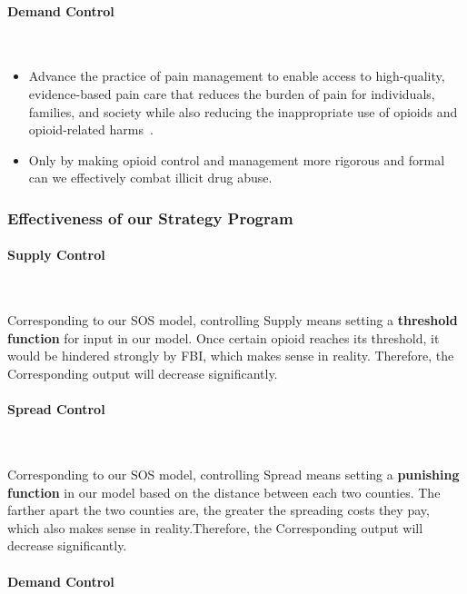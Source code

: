 \documentclass{mcmthesis}
\begin{document}
\paragraph{\textbf{Demand Control}}
~\smallskip

\begin{itemize}
    \item Advance the practice of pain management to enable access to high-quality, evidence-based pain care that reduces the burden of pain for individuals, families, and society while also reducing the inappropriate use of opioids and opioid-related harms~\cite{SEIGERMAN201928}.
    \item Only by making opioid control and management more rigorous and formal can we effectively combat illicit drug abuse.
\end{itemize}

\subsubsection{Effectiveness of our Strategy Program}
\paragraph{\textbf{Supply Control}}

~\smallskip

Corresponding to our SOS model, controlling Supply means setting a \textbf{threshold function} for input in our model. Once certain opioid reaches its threshold, it would be hindered strongly by FBI, which makes sense in reality. Therefore, the Corresponding output will decrease significantly.
\paragraph{\textbf{Spread Control}}

~\smallskip

Corresponding to our SOS model, controlling Spread means setting a \textbf{punishing function }in our model based on the distance between each two counties. The farther apart the two counties are, the greater the spreading costs they pay, which also makes sense in reality.Therefore, the Corresponding output will decrease significantly.
\paragraph{\textbf{Demand Control}}

~\smallskip
\end{document}
